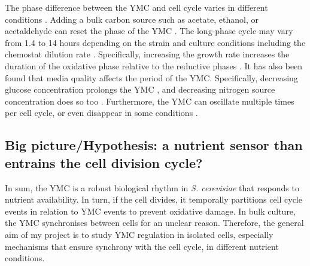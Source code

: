 The phase difference between the YMC and cell cycle varies in different conditions %
\citep{ewaldYeastCyclinDependentKinase2016}. %
Adding a bulk carbon source such as acetate, ethanol, or acetaldehyde can reset the phase of the YMC \citep{kuangMsn2RegulateExpression2017, krishnaMinimalPushPull2018}.
The long-phase cycle may vary from 1.4 to 14 hours depending on the strain and culture conditions including the chemostat dilution rate \citep{caustonMetabolicRhythmsFramework2018}. %
Specifically, increasing the growth rate increases the duration of the oxidative phase relative to the reductive phases \citep{slavovCouplingGrowthRate2011}.
It has also been found that media quality affects the period of the YMC.
Specifically, decreasing glucose concentration prolongs the YMC \citep{mellorMolecularBasisMetabolic2016,papagiannakisAutonomousMetabolicOscillations2017},
and decreasing nitrogen source concentration does so too \citep{baumgartnerFlavinbasedMetabolicCycles2018}.
Furthermore, the YMC can oscillate multiple times per cell cycle, or even disappear in some conditions \citep{baumgartnerFlavinbasedMetabolicCycles2018}. %

\subsection{Big picture/Hypothesis: a nutrient sensor than entrains the cell division cycle?}
\label{subsec:intro-ymc-hypothesis}
In sum, the YMC is a robust biological rhythm in \emph{S. cerevisiae} that responds to nutrient availability.
In turn, if the cell divides, it temporally partitions cell cycle events in relation to YMC events to prevent oxidative damage.
In bulk culture, the YMC synchronises between cells for an unclear reason.
Therefore, the general aim of my project is to study YMC regulation in isolated cells, especially mechanisms that ensure synchrony with the cell cycle, in different nutrient conditions.

